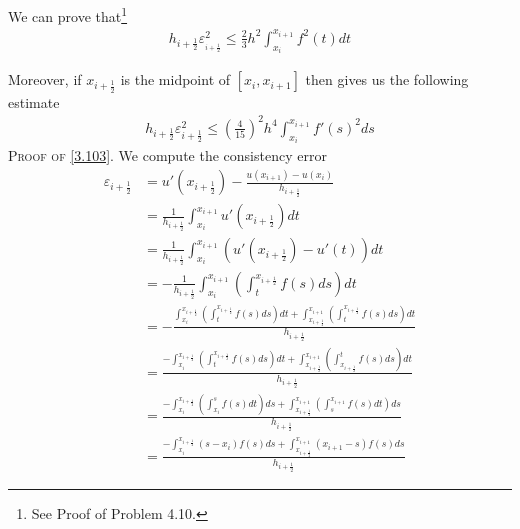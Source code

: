 \documentclass[a4paper]{article}
\numberwithin{equation}{section}
\begin{document}
We can prove that\footnote{See Proof of Problem 4.10.}
\begin{align}
\label{3.102}
{h_{i + \frac{1}{2}}}\varepsilon _{_{i + \frac{1}{2}}}^2 \le {\frac{2}{3}}{h^2}\int_{{x_i}}^{{x_{i + 1}}} {{f^2}\left( t \right)dt} 
\end{align}

Moreover, if ${x_{i + \frac{1}{2}}}$ is the midpoint of $\left[x_i,x_{i+1}\right]$ then \cite{1} gives us the following estimate
\begin{align}
\label{3.103}
{h_{i + \frac{1}{2}}}\varepsilon _{i + \frac{1}{2}}^2 \le {\left( {\frac{4}{{15}}} \right)^2}{h^4}\int_{{x_i}}^{{x_{i + 1}}} {f'{{\left( s \right)}^2}ds} 
\end{align}
\textsc{Proof of \eqref{3.103}}. We compute the consistency error
\begin{align}
{\varepsilon _{i + \frac{1}{2}}} &= u'\left( {{x_{i + \frac{1}{2}}}} \right) - \frac{{u\left( {{x_{i + 1}}} \right) - u\left( {{x_i}} \right)}}{{{h_{i + \frac{1}{2}}}}}\\
 &= \frac{1}{{{h_{i + \frac{1}{2}}}}}\int_{{x_i}}^{{x_{i + 1}}} {u'\left( {{x_{i + \frac{1}{2}}}} \right)dt} \\
 &= \frac{1}{{{h_{i + \frac{1}{2}}}}}\int_{{x_i}}^{{x_{i + 1}}} {\left( {u'\left( {{x_{i + \frac{1}{2}}}} \right) - u'\left( t \right)} \right)dt} \\
 &=  - \frac{1}{{{h_{i + \frac{1}{2}}}}}\int_{{x_i}}^{{x_{i + 1}}} {\left( {\int_t^{{x_{i + \frac{1}{2}}}} {f\left( s \right)ds} } \right)dt} \\
 &=  - \frac{{\int_{{x_i}}^{{x_{i + \frac{1}{2}}}} {\left( {\int_t^{{x_{i + \frac{1}{2}}}} {f\left( s \right)ds} } \right)dt}  + \int_{{x_{i + \frac{1}{2}}}}^{{x_{i + 1}}} {\left( {\int_t^{{x_{i + \frac{1}{2}}}} {f\left( s \right)ds} } \right)dt} }}{{{h_{i + \frac{1}{2}}}}}\\
 &= \frac{{ - \int_{{x_i}}^{{x_{i + \frac{1}{2}}}} {\left( {\int_t^{{x_{i + \frac{1}{2}}}} {f\left( s \right)ds} } \right)dt}  + \int_{{x_{i + \frac{1}{2}}}}^{{x_{i + 1}}} {\left( {\int_{{x_{i + \frac{1}{2}}}}^t {f\left( s \right)ds} } \right)dt} }}{{{h_{i + \frac{1}{2}}}}}\\
 &= \frac{{ - \int_{{x_i}}^{{x_{i + \frac{1}{2}}}} {\left( {\int_{{x_i}}^s {f\left( s \right)dt} } \right)ds}  + \int_{{x_{i + \frac{1}{2}}}}^{{x_{i + 1}}} {\left( {\int_s^{{x_{i + 1}}} {f\left( s \right)dt} } \right)ds} }}{{{h_{i + \frac{1}{2}}}}}\\
 &= \frac{{ - \int_{{x_i}}^{{x_{i + \frac{1}{2}}}} {\left( {s - {x_i}} \right)f\left( s \right)ds}  + \int_{{x_{i + \frac{1}{2}}}}^{{x_{i + 1}}} {\left( {{x_{i + 1}} - s} \right)f\left( s \right)ds} }}{{{h_{i + \frac{1}{2}}}}} \label{3.111}
\end{align}
\end{document}
